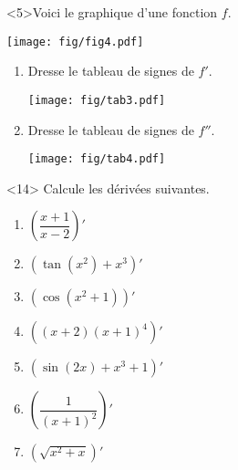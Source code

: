 \documentclass[a4paper,12pt, rulers]{tests2}
\providecommand{\tightlist}{%
  \setlength{\itemsep}{0pt}\setlength{\parskip}{0pt}}
\begin{document}
\begin{question}<5>Voici le graphique d'une fonction \(f\).

  \begin{minipage}[r]{0.4\linewidth}
    \texttt{[image: fig/fig4.pdf]}
  \end{minipage}
  \begin{minipage}{0.59\linewidth}
    \begin{enumerate}
      \def\labelenumi{\arabic{enumi}.}  \tightlist
    \item Dresse le tableau de signes de \(f'\).

      \texttt{[image: fig/tab3.pdf]}

      \def\labelenumi{\arabic{enumi}.}  \setcounter{enumi}{1}
      \tightlist
    \item Dresse le tableau de signes de \(f''\).

      \texttt{[image: fig/tab4.pdf]}

    \end{enumerate}
  \end{minipage}
\end{question}
\newpage
\begin{question}<14>
Calcule les dérivées suivantes.

\begin{enumerate}
\def\labelenumi{\arabic{enumi}.}
\tightlist
\item
  \(\left(\dfrac{x+1}{x-2}\right)'\) \vspace{5cm}
\item
  \(\left(\tan(x^2)+x^3\right)'\) \vspace{5cm}
\item
  \(\left(\cos(x^2+1)\right)'\) \vspace{5cm}
\item
  \(\left((x+2)(x+1)^4\right)'\) \vspace{5cm}
\item
  \(\left(\sin(2x)+x^3+1\right)'\) \vspace{5cm}
\item
  \(\left(\dfrac{1}{(x+1)^2}\right)'\) \vspace{5cm}
\item
  \(\left(\sqrt{x^2+x}\right)'\) \vspace{5cm}
\end{enumerate}

\end{question}

\newpage{}
\end{document}
